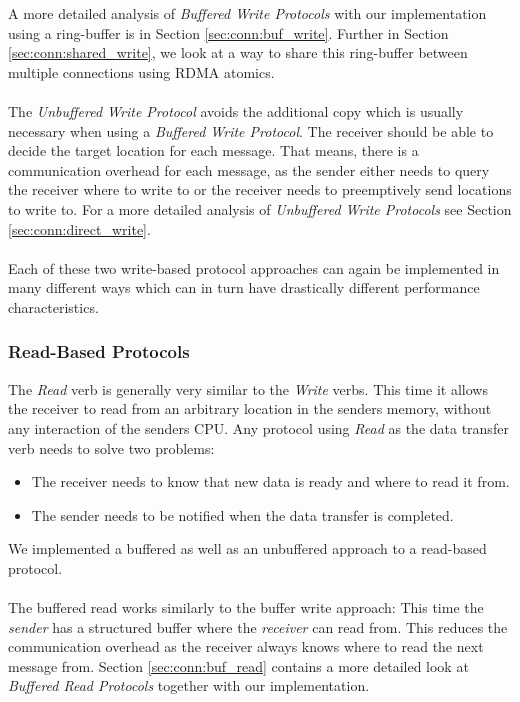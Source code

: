 A more detailed analysis of \emph{Buffered Write Protocols} with our implementation using a ring-buffer is in 
Section \ref{sec:conn:buf_write}. Further in Section \ref{sec:conn:shared_write},
we look at a way to share this ring-buffer between multiple connections using RDMA atomics.


\paragraph{} The  \emph{Unbuffered Write Protocol} avoids the additional copy which is usually necessary when 
using a \emph{Buffered Write Protocol}. The receiver should be able to decide the target location for each message. 
That means, there is a communication overhead for each message, as the sender either needs to query the receiver where to 
write to or the receiver needs to preemptively send locations to write to.
For a more detailed analysis of \emph{Unbuffered Write Protocols} see Section \ref{sec:conn:direct_write}.


\paragraph{}Each of these two write-based protocol approaches can again be implemented in many different ways which can
in turn have drastically different performance characteristics. 


\subsubsection{Read-Based Protocols}
The \emph{Read} verb is generally very similar to the \emph{Write} verbs. This time it allows the receiver to read from 
an arbitrary location in the senders memory, without any interaction of the senders CPU. Any protocol
using \emph{Read} as the data transfer verb needs to solve two problems:

\begin{itemize}
  \item The receiver needs to know that new data is ready and where to read it from.
  \item The sender needs to be notified when the data transfer is completed.
\end{itemize}

We implemented a buffered as well as an unbuffered approach to a read-based protocol. 


\paragraph{} The buffered read works similarly to the buffer write approach: This time the \emph{sender} has a structured buffer where the 
\emph{receiver} can read from. This reduces the communication overhead as the receiver always knows where to read the next 
message from. Section \ref{sec:conn:buf_read} contains a more detailed look at \emph{Buffered Read Protocols} together with 
our implementation.

